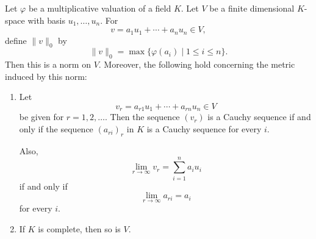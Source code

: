     \begin{exercise}
    Let $\varphi$ be a multiplicative valuation of a field $K$. Let $V$ be a finite dimensional
    $K$-space with basis $u_1,\dots,u_n$. For
    \[
        v=a_1u_1+\cdots+a_nu_n\in V,
    \]
    define $\|v\|_0$ by
    \[
        \|v\|_0=\max\{\varphi(a_i)\mid 1\leq i\leq n\}.
    \]
    Then this is a norm on $V$. Moreover, the following hold concerning the metric induced by
    this norm:
    \begin{enumerate}
        \item Let
        \[
            v_r=a_{r1}u_1+\cdots+a_{rn}u_n\in V
        \]
        be given for $r=1,2,\dots$. Then the sequence $(v_r)$ is a Cauchy sequence if and only if
        the sequence $(a_{ri})_r$ in $K$ is a Cauchy sequence for every $i$.
    
        Also,
        \[
            \lim_{r\to\infty}v_r=\sum_{i=1}^n a_i u_i
        \]
        if and only if
        \[
            \lim_{r\to\infty}a_{ri}=a_i
        \]
        for every $i$.
    
        \item If $K$ is complete, then so is $V$.
    \end{enumerate}
    \end{exercise}


